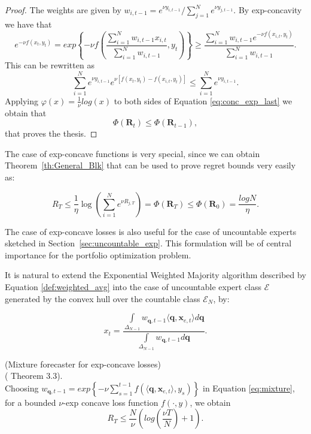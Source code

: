 \begin{proof}
    The weights are given by $w_{i,t-1}=e^{\nu y_{i,t-1}}/\sum\limits_{j=1}^N e^{\nu y_{j,t-1}}$.
    By exp-concavity we have that
    \begin{equation}
        e^{-\nu f(x_t,y_t)}=exp\left\{-\nu f \left(\frac{\sum\limits_{i=1}^N w_{i,t-1}x_{i,t}}{\sum\limits_{i=1}^N w_{i,t-1}},y_t\right)\right\}\ge \frac{\sum\limits_{i=1}^N w_{i,t-1}e^{-\nu f(x_{i,t},y_t)}}{\sum\limits_{i=1}^N w_{i,t-1}}.
    \end{equation}
    This can be rewritten as 
    \begin{equation}\label{eq:conc_exp_last}
        \sum\limits_{i=1}^N e^{\nu y_{i,t-1}}e^{\nu [f(x_t,y_t)-f(x_{i,t},y_t)]}\le \sum\limits_{i=1}^N e^{\nu y_{i,t-1}}.
    \end{equation}
    Applying $\varphi(x)=\frac{1}{\nu}log(x)$ to both sides of Equation \eqref{eq:conc_exp_last} we obtain that $$\Phi(\mathbf R_{t})\le \Phi(\mathbf R_{t-1}),$$ that proves the thesis.
\end{proof}

The case of exp-concave functions is very special, since we can obtain Theorem~\ref{th:General_Blk} that can be used to prove regret bounds very easily as:

\begin{equation}\label{eq:regret_exp_finite}
    R_T\le \frac{1}{\eta}\log\left(\sum\limits_{i=1}^N e^{\nu R_{j,T}}\right)=\Phi(\mathbf R_T)\le\Phi(\mathbf R_0) = \frac{log N}{\eta}.
\end{equation}

The case of exp-concave losses is also useful for the case of uncountable experts sketched in Section~\ref{sec:uncountable_exp}. This formulation will be of central importance for the portfolio optimization problem.

It is natural to extend the Exponential Weighted Majority algorithm described by Equation \eqref{def:weighted_avg} into the case of uncountable expert class $\mathcal E$ generated by the convex hull over the countable class $\mathcal E_N$, by:

\begin{equation}\label{eq:mixture}
    x_t=\frac{\int\limits_{\Delta_{N-1}} w_{\mathbf q,t-1}\langle \mathbf q, \mathbf x_{e,t}\rangle d\mathbf q}{\int\limits_{\Delta_{N-1}} w_{\mathbf q,t-1}d\mathbf q}.
\end{equation}

\begin{theorem}(Mixture forecaster for exp-concave losses)\\
(\cite{cesa2006prediction} Theorem 3.3).\label{th:mixture_forecaster}\\
    Choosing $w_{\mathbf q,t-1}=exp\left\{-\nu\sum\limits_{s=1}^{t-1}f(\langle \mathbf q,\mathbf x_{e,t}\rangle,y_s)\right\}$ in Equation \eqref{eq:mixture}, for a bounded $\nu$-exp concave loss function $f(\cdot,y)$, we obtain
    $$R_T\le \frac{N}{\nu}\left(log\left(\frac{\nu T}{N}\right)+1\right).$$
\end{theorem}

